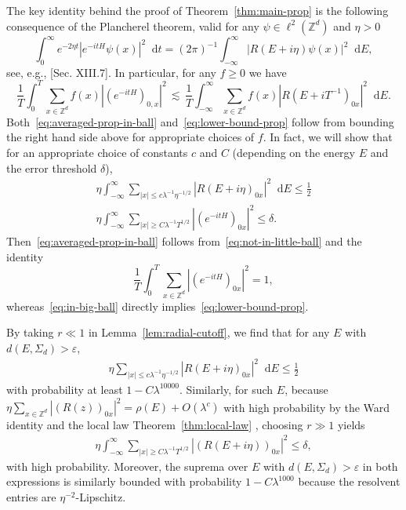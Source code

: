 \documentclass[11pt]{amsart}
\def\bbZ{{\mathbb Z}}
\def\Z{{\mathbb{Z}}}
\def\eps{{\varepsilon}}
\newcommand{\diff}{\mathop{}\!\mathrm{d}}
\def\lsim{{\,\lesssim\,}}
\numberwithin{equation}{section}
\numberwithin{theorem}{section}
\begin{document}
The key identity behind the proof of Theorem~\ref{thm:main-prop} is the following consequence
of the Plancherel theorem, valid for any $\psi\in \ell^2(\Z^d)$ and $\eta>0$
\begin{equation}
\label{eq:parseval-again}
\int_0^\infty e^{-2\eta t} |e^{-itH}\psi(x)|^2 \diff t
= (2\pi)^{-1}\int_{-\infty}^\infty |R(E+i\eta)\psi (x)|^2 \diff E,
\end{equation}
see, e.g., \cite{reed1978iv}[Sec. XIII.7].
In particular, for any $f\geq 0$ we have
\[
\frac1T\int_0^T \sum_{x\in\Z^d} f(x)|(e^{-itH})_{0,x}|^2
\lsim \frac1T \int_{-\infty}^\infty \sum_{x\in\Z^d} f(x) |R(E+i T^{-1})_{0x}|^2\diff E.
\]
Both~\eqref{eq:averaged-prop-in-ball} and~\eqref{eq:lower-bound-prop} follow from bounding the
right hand side above for appropriate choices of $f$.   In fact, we will show that for
an appropriate choice of constants $c$ and $C$ (depending on the energy $E$ and the error
threshold $\delta$),
\begin{align}
\label{eq:not-in-little-ball}
\eta \int_{-\infty}^\infty\sum_{|x|\leq c\lambda^{-1}\eta^{-1/2}} |R(E+i\eta)_{0x}|^2 \diff E
\leq \frac12 \\
\label{eq:in-big-ball}
\eta \int_{-\infty}^\infty
\sum_{|x|\geq C\lambda^{-1}T^{1/2}} |(e^{-itH})_{0x}|^2 \leq \delta.
\end{align}
Then~\eqref{eq:averaged-prop-in-ball} follows from~\eqref{eq:not-in-little-ball} and the identity
\[
\frac1T\int_0^T \sum_{x\in\bbZ^d} |(e^{-itH})_{0x} |^2 = 1,
\]
whereas~\eqref{eq:in-big-ball} directly implies~\eqref{eq:lower-bound-prop}.

By taking $r\ll 1$ in Lemma~\ref{lem:radial-cutoff}, we find that for any $E$ with $d(E,\Sigma_d)>\eps$,
\begin{align*}
\eta \sum_{|x|\leq c\lambda^{-1}\eta^{-1/2}} |R(E+i\eta)_{0x}|^2 \diff E
\leq \frac12
\end{align*}
with probability at least $1-C\lambda^{10000}$. Similarly, for such $E$, because $\eta\sum_{x\in\Z^d}|(R(z))_{0x}|^2=\rho(E)+O(\lambda^c)$ with high probability by the Ward identity and the local law Theorem~\ref{thm:local-law}
, choosing $r\gg 1$ yields
\begin{align*}
\eta \int_{-\infty}^\infty
\sum_{|x|\geq C\lambda^{-1}T^{1/2}} |(R(E+i\eta))_{0x}|^2 \leq \delta,
\end{align*}
with high probability.
Moreover, the suprema over $E$ with $d(E,\Sigma_d)>\eps$ in both expressions is similarly bounded with probability $1-C\lambda^{1000}$ because the resolvent entries are $\eta^{-2}$-Lipschitz.
\end{document}
